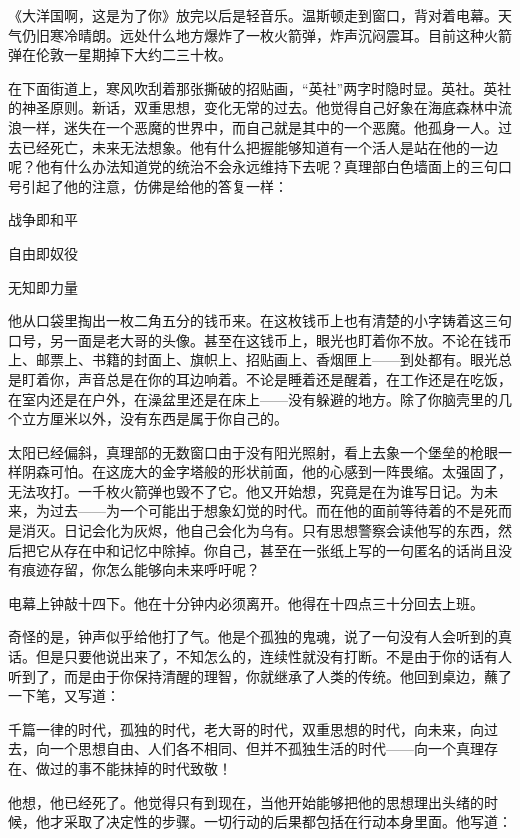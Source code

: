 《大洋国啊，这是为了你》放完以后是轻音乐。温斯顿走到窗口，背对着电幕。天气仍旧寒冷晴朗。远处什么地方爆炸了一枚火箭弹，炸声沉闷震耳。目前这种火箭弹在伦敦一星期掉下大约二三十枚。


在下面街道上，寒风吹刮着那张撕破的招贴画，“英社”两字时隐时显。英社。英社的神圣原则。新话，双重思想，变化无常的过去。他觉得自己好象在海底森林中流浪一样，迷失在一个恶魔的世界中，而自己就是其中的一个恶魔。他孤身一人。过去已经死亡，未来无法想象。他有什么把握能够知道有一个活人是站在他的一边呢？他有什么办法知道党的统治不会永远维持下去呢？真理部白色墙面上的三句口号引起了他的注意，仿佛是给他的答复一样：



战争即和平


自由即奴役


无知即力量



他从口袋里掏出一枚二角五分的钱币来。在这枚钱币上也有清楚的小字铸着这三句口号，另一面是老大哥的头像。甚至在这钱币上，眼光也盯着你不放。不论在钱币上、邮票上、书籍的封面上、旗帜上、招贴画上、香烟匣上——到处都有。眼光总是盯着你，声音总是在你的耳边响着。不论是睡着还是醒着，在工作还是在吃饭，在室内还是在户外，在澡盆里还是在床上——没有躲避的地方。除了你脑壳里的几个立方厘米以外，没有东西是属于你自己的。


太阳已经偏斜，真理部的无数窗口由于没有阳光照射，看上去象一个堡垒的枪眼一样阴森可怕。在这庞大的金字塔般的形状前面，他的心感到一阵畏缩。太强固了，无法攻打。一千枚火箭弹也毁不了它。他又开始想，究竟是在为谁写日记。为未来，为过去——为一个可能出于想象幻觉的时代。而在他的面前等待着的不是死而是消灭。日记会化为灰烬，他自己会化为乌有。只有思想警察会读他写的东西，然后把它从存在中和记忆中除掉。你自己，甚至在一张纸上写的一句匿名的话尚且没有痕迹存留，你怎么能够向未来呼吁呢？


电幕上钟敲十四下。他在十分钟内必须离开。他得在十四点三十分回去上班。


奇怪的是，钟声似乎给他打了气。他是个孤独的鬼魂，说了一句没有人会听到的真话。但是只要他说出来了，不知怎么的，连续性就没有打断。不是由于你的话有人听到了，而是由于你保持清醒的理智，你就继承了人类的传统。他回到桌边，蘸了一下笔，又写道：


千篇一律的时代，孤独的时代，老大哥的时代，双重思想的时代，向未来，向过去，向一个思想自由、人们各不相同、但并不孤独生活的时代——向一个真理存在、做过的事不能抹掉的时代致敬！


他想，他已经死了。他觉得只有到现在，当他开始能够把他的思想理出头绪的时候，他才采取了决定性的步骤。一切行动的后果都包括在行动本身里面。他写道：


